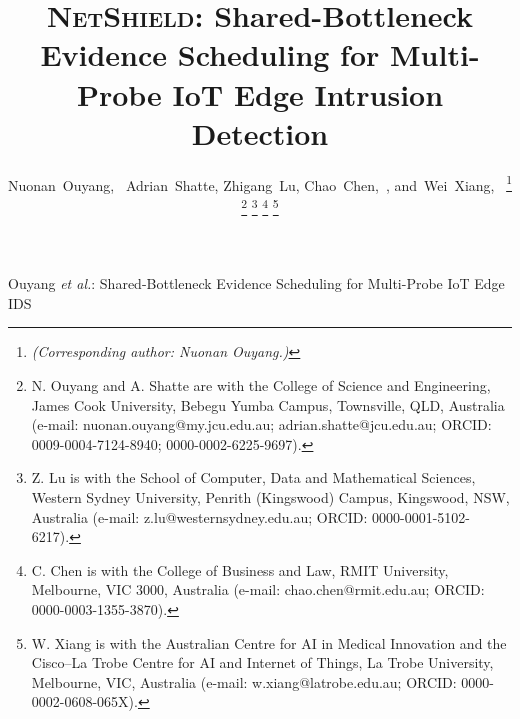 \documentclass[10pt,journal]{IEEEtran}
\newcommand{\NetShield}{\textsc{NetShield}}
\begin{document}
\title{\NetShield: Shared-Bottleneck Evidence Scheduling for Multi-Probe IoT Edge Intrusion Detection}

\author{Nuonan~Ouyang,~
        Adrian~Shatte,
        Zhigang~Lu,
        Chao~Chen,~,
        and~Wei~Xiang,~%
\thanks{\textit{(Corresponding author: Nuonan Ouyang.)}}%
\thanks{N. Ouyang and A. Shatte are with the College of Science and Engineering, James Cook University, Bebegu Yumba Campus, Townsville, QLD, Australia (e-mail: nuonan.ouyang@my.jcu.edu.au; adrian.shatte@jcu.edu.au; ORCID: 0009-0004-7124-8940; 0000-0002-6225-9697).}%
\thanks{Z. Lu is with the School of Computer, Data and Mathematical Sciences, Western Sydney University, Penrith (Kingswood) Campus, Kingswood, NSW, Australia (e-mail: z.lu@westernsydney.edu.au; ORCID: 0000-0001-5102-6217).}%
\thanks{C. Chen is with the College of Business and Law, RMIT University, Melbourne, VIC 3000, Australia (e-mail: chao.chen@rmit.edu.au; ORCID: 0000-0003-1355-3870).}%
\thanks{W. Xiang is with the Australian Centre for AI in Medical Innovation and the Cisco--La Trobe Centre for AI and Internet of Things, La Trobe University, Melbourne, VIC, Australia (e-mail: w.xiang@latrobe.edu.au; ORCID: 0000-0002-0608-065X).}%
}

%
{Ouyang \MakeLowercase{\textit{et al.}}: Shared-Bottleneck Evidence Scheduling for Multi-Probe IoT Edge IDS}

\maketitle
\end{document}
